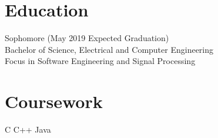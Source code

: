 \documentclass{cv_class}
\begin{document}


\section{Education}
Sophomore (May 2019 Expected Graduation) \\
Bachelor of Science, Electrical and Computer Engineering \\
Focus in Software Engineering and Signal Processing \\

\section{Coursework}
\bullets
{C}
{C++}
{Java}
\end{document}
